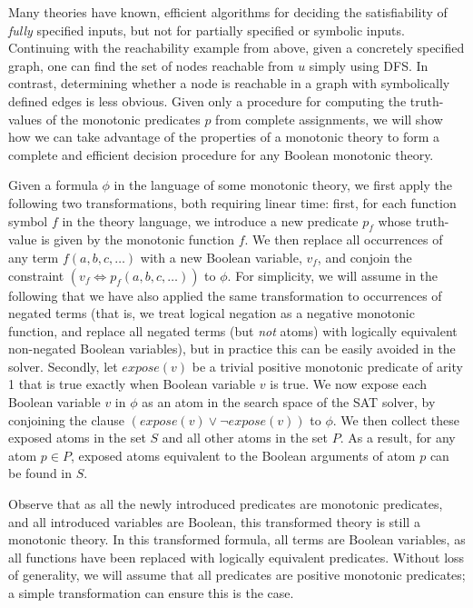 \documentclass[runningheads]{llncs}
\begin{document}
Many theories have known, efficient
algorithms for deciding the satisfiability of \textit{fully} specified inputs, but not for partially
specified or symbolic inputs. Continuing with the reachability example from above, given a concretely specified graph, one can find the set of nodes reachable from $u$ simply using DFS. In contrast, determining whether a node is reachable in a graph with symbolically defined edges is less obvious. Given only a procedure for computing the truth-values of the monotonic predicates
$p$ from complete assignments, we will show how we can take advantage of the properties of a monotonic theory
to form a complete and efficient decision procedure for any Boolean monotonic theory. 

Given a formula $\phi$ in the language of some monotonic theory, we first apply the following two transformations, both requiring
linear time: first, for each function symbol $f$ in the theory language, we introduce a new predicate $p_f$ whose truth-value is given by the monotonic function $f$.
We then replace all occurrences of any term $f(a,b,c,\ldots)$ with a new Boolean variable, $v_f$, and conjoin the constraint $(v_f \Leftrightarrow p_f(a,b,c,\ldots))$ to $\phi$. For simplicity, we will assume in the following that we have also applied the same transformation to occurrences of negated terms (that is, we treat logical negation as a negative monotonic function, and replace all negated terms (but \textit{not} atoms) with logically equivalent non-negated Boolean variables), but in practice this can be easily avoided in the solver.
Secondly, let $expose(v)$ be a trivial positive monotonic predicate of arity 1 that is true exactly when Boolean variable $v$ is true. 
We now expose each Boolean variable $v$ in $\phi$ as an atom in the search space of the SAT solver, by conjoining the clause $(expose(v) \lor \lnot expose(v))$ to $\phi$. We then collect these exposed atoms in the set $S$ and all other atoms in the set $P$. As a result, for any atom $p \in P$, exposed atoms equivalent to the Boolean arguments of atom $p$ can be found in $S$.

Observe that as all the newly introduced predicates are monotonic predicates, and all introduced variables are Boolean, this transformed theory is still a monotonic theory. In this transformed formula, all terms are Boolean variables, as all functions have been replaced with logically equivalent predicates. Without loss of generality, we will assume that all predicates are positive monotonic predicates; a simple transformation can ensure this is the case.
\end{document}
